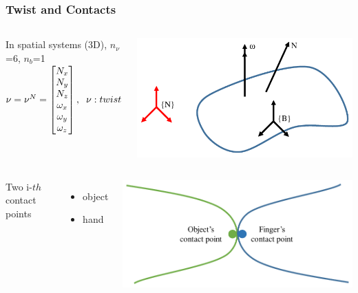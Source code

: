 \documentclass{beamer}
\begin{document}
\begin{frame}
\frametitle{Twist and Contacts}
\begin{columns}[c] %

In spatial systems (3D), $n_{\nu}$=6, $n_b$=1\\
$\nu = \nu^{N} = \begin{bmatrix}
N_x\\
N_y\\
N_z\\
\omega_x\\
\omega_y\\
\omega_z
\end{bmatrix}, \hspace{.2cm} \nu: twist $

\centering
 \includegraphics[width=.9\textwidth]{figures/GeneralizedVelocityCrop.pdf}
\end{columns}

\begin{columns}[c] %

Two i-$th$ contact points
\begin{itemize}
\item object \vspace{0.2cm}
\item hand \vspace{0.2cm}
\end{itemize}

\centering
 \includegraphics[width=\textwidth]{figures/ContactPointsCrop.pdf}
\end{columns}

\end{frame}
\end{document}
